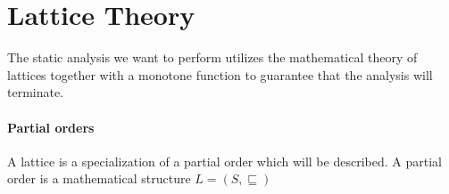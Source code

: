 \section{Lattice Theory}
  The static analysis we want to perform utilizes the mathematical theory of lattices together with a monotone function to guarantee that the analysis will terminate.

  \paragraph{Partial orders}
  A lattice is a specialization of a partial order which will be described.
  A partial order is a mathematical structure $L = (S, \sqsubseteq)$

